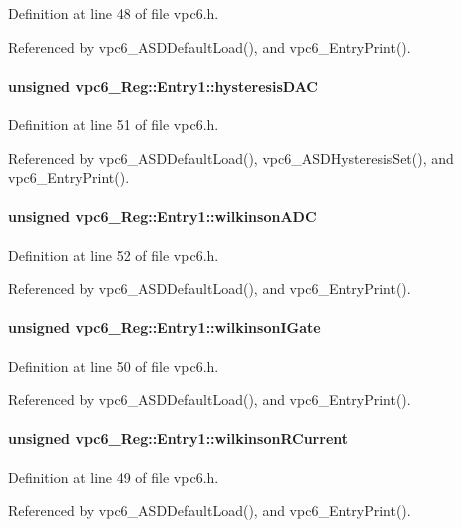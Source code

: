 Definition at line 48 of file vpc6.h.

Referenced by vpc6\_\-ASDDefaultLoad(), and vpc6\_\-EntryPrint().
\paragraph[{hysteresisDAC}]{\setlength{\rightskip}{0pt plus 5cm}unsigned {\bf vpc6\_\-Reg::Entry1::hysteresisDAC}}\hfill\label{structvpc6__Reg_1_1Entry1_a2e92749245bc8176587f4395258080e9}


Definition at line 51 of file vpc6.h.

Referenced by vpc6\_\-ASDDefaultLoad(), vpc6\_\-ASDHysteresisSet(), and vpc6\_\-EntryPrint().
\paragraph[{wilkinsonADC}]{\setlength{\rightskip}{0pt plus 5cm}unsigned {\bf vpc6\_\-Reg::Entry1::wilkinsonADC}}\hfill\label{structvpc6__Reg_1_1Entry1_aa682902191aa314859b452b2ed3b6952}


Definition at line 52 of file vpc6.h.

Referenced by vpc6\_\-ASDDefaultLoad(), and vpc6\_\-EntryPrint().
\paragraph[{wilkinsonIGate}]{\setlength{\rightskip}{0pt plus 5cm}unsigned {\bf vpc6\_\-Reg::Entry1::wilkinsonIGate}}\hfill\label{structvpc6__Reg_1_1Entry1_a49762e5741bb3b7f16becc11cdae9dc0}


Definition at line 50 of file vpc6.h.

Referenced by vpc6\_\-ASDDefaultLoad(), and vpc6\_\-EntryPrint().
\paragraph[{wilkinsonRCurrent}]{\setlength{\rightskip}{0pt plus 5cm}unsigned {\bf vpc6\_\-Reg::Entry1::wilkinsonRCurrent}}\hfill\label{structvpc6__Reg_1_1Entry1_a6d2fea9d1825f18b0d3a455141770d21}


Definition at line 49 of file vpc6.h.

Referenced by vpc6\_\-ASDDefaultLoad(), and vpc6\_\-EntryPrint().